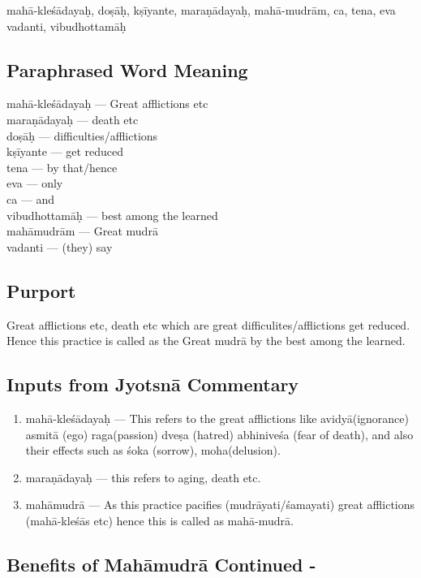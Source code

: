 mahā-kleśādayaḥ, doṣāḥ, kṣīyante, maraṇādayaḥ, mahā-mudrām, ca, tena, eva vadanti, vibudhottamāḥ

\subsection*{Paraphrased Word Meaning}

\begin{multicols}{2}
mahā-kleśādayaḥ --- Great afflictions etc \\
maraṇādayaḥ --- death etc \\
doṣāḥ  --- difficulties/afflictions\\ 
kṣīyante  --- get reduced  \\
tena --- by that/hence \\
eva ---   only \\
ca ---  and \\
vibudhottamāḥ --- best among the learned   \\
mahāmudrām  --- Great mudrā\\
vadanti  --- (they) say
\end{multicols}

\subsection*{Purport}

Great afflictions etc, death etc which are great difficulites/afflictions get reduced. Hence this practice is called as the Great mudrā by the best among the learned.

\subsection*{Inputs from Jyotsnā Commentary}

\begin{enumerate}
\item mahā-kleśādayaḥ --- This refers to the great afflictions like  avidyā(ignorance)  asmitā (ego) raga(passion) dveṣa (hatred) abhiniveśa (fear of death), and also their effects such as śoka (sorrow), moha(delusion). 
\item maraṇādayaḥ --- this refers to aging, death etc. 
\item mahāmudrā --- As this practice pacifies (mudrāyati/śamayati) great afflictions (mahā-kleśās etc) hence this is called as mahā-mudrā.
\end{enumerate}

\subsection*{Benefits of Mahāmudrā Continued -}

